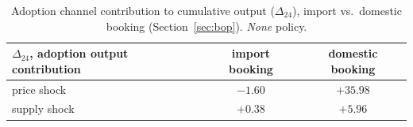 \begin{table}[H]\centering
\small
\begin{tabular}{lcc}
\toprule
$\Delta_{24}$, adoption output contribution & import booking & domestic booking\\
\midrule
price shock & $-1.60$ & $+35.98$\\
supply shock & $+0.38$ & $+5.96$\\
\bottomrule
\end{tabular}
\caption{Adoption channel contribution to cumulative output ($\Delta_{24}$), import vs.\ domestic booking (Section~\ref{sec:bop}). \emph{None} policy.}
\label{tab:signmap}
\end{table}
